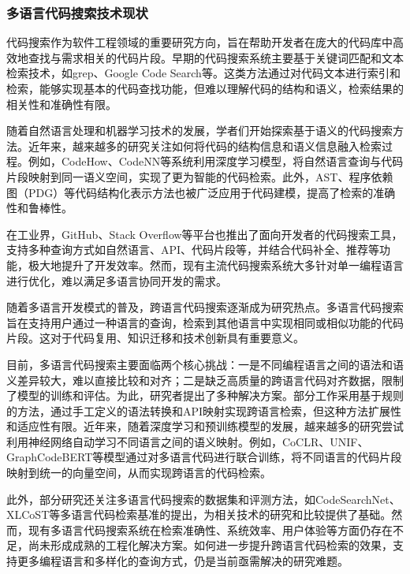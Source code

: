 \documentclass[UTF8,a4paper,12pt]{ctexart}
\numberwithin{equation}{section}
\begin{document}
\subsubsection{多语言代码搜索技术现状}
代码搜索作为软件工程领域的重要研究方向，旨在帮助开发者在庞大的代码库中高效地查找与需求相关的代码片段。早期的代码搜索系统主要基于关键词匹配和文本检索技术，如grep、Google Code Search等。这类方法通过对代码文本进行索引和检索，能够实现基本的代码查找功能，但难以理解代码的结构和语义，检索结果的相关性和准确性有限。\par
随着自然语言处理和机器学习技术的发展，学者们开始探索基于语义的代码搜索方法\cite{ref0}。近年来，越来越多的研究关注如何将代码的结构信息和语义信息融入检索过程。例如，CodeHow\cite{ref1}、CodeNN\cite{ref2}等系统利用深度学习模型，将自然语言查询与代码片段映射到同一语义空间，实现了更为智能的代码检索。此外，AST、程序依赖图（PDG）等代码结构化表示方法也被广泛应用于代码建模，提高了检索的准确性和鲁棒性。\par
在工业界，GitHub、Stack Overflow等平台也推出了面向开发者的代码搜索工具，支持多种查询方式如自然语言、API、代码片段等，并结合代码补全、推荐等功能，极大地提升了开发效率。然而，现有主流代码搜索系统大多针对单一编程语言进行优化，难以满足多语言协同开发的需求。\par
随着多语言开发模式的普及，跨语言代码搜索逐渐成为研究热点。多语言代码搜索旨在支持用户通过一种语言的查询，检索到其他语言中实现相同或相似功能的代码片段。这对于代码复用、知识迁移和技术创新具有重要意义。\par
目前，多语言代码搜索主要面临两个核心挑战：一是不同编程语言之间的语法和语义差异较大，难以直接比较和对齐；二是缺乏高质量的跨语言代码对齐数据，限制了模型的训练和评估。为此，研究者提出了多种解决方案。部分工作采用基于规则的方法，通过手工定义的语法转换和API映射实现跨语言检索，但这种方法扩展性和适应性有限。近年来，随着深度学习和预训练模型的发展，越来越多的研究尝试利用神经网络自动学习不同语言之间的语义映射。例如，CoCLR\cite{ref3}、UNIF\cite{ref4}、GraphCodeBERT\cite{ref5}等模型通过对多语言代码进行联合训练，将不同语言的代码片段映射到统一的向量空间，从而实现跨语言的代码检索。\par
此外，部分研究还关注多语言代码搜索的数据集和评测方法，如CodeSearchNet\cite{ref6}、XLCoST\cite{ref7}等多语言代码检索基准的提出，为相关技术的研究和比较提供了基础。然而，现有多语言代码搜索系统在检索准确性、系统效率、用户体验等方面仍存在不足，尚未形成成熟的工程化解决方案。如何进一步提升跨语言代码检索的效果，支持更多编程语言和多样化的查询方式，仍是当前亟需解决的研究难题。
\end{document}
